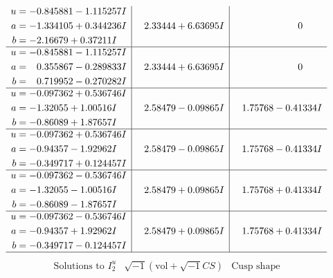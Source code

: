 \documentclass[1p]{elsarticle_modified}
\theoremstyle{definition}
\newcommand{\I}{\sqrt{-1}}
\begin{document}
$$\begin{array}{c|c|c}
\begin{aligned}
u &= -0.845881 - 1.115257 I \\
a &= -1.334105 + 0.344236 I \\
b &= -2.16679 + 0.37211 I\end{aligned}
 & \phantom{-}2.33444 + 6.63695 I & \phantom{-0.000000 } 0 \\ \hline\begin{aligned}
u &= -0.845881 - 1.115257 I \\
a &= \phantom{-}0.355867 - 0.289833 I \\
b &= \phantom{-}0.719952 - 0.270282 I\end{aligned}
 & \phantom{-}2.33444 + 6.63695 I & \phantom{-0.000000 } 0 \\ \hline\begin{aligned}
u &= -0.097362 + 0.536746 I \\
a &= -1.32055 + 1.00516 I \\
b &= -0.86089 + 1.87657 I\end{aligned}
 & \phantom{-}2.58479 - 0.09865 I & \phantom{-}1.75768 - 0.41334 I \\ \hline\begin{aligned}
u &= -0.097362 + 0.536746 I \\
a &= -0.94357 - 1.92962 I \\
b &= -0.349717 + 0.124457 I\end{aligned}
 & \phantom{-}2.58479 - 0.09865 I & \phantom{-}1.75768 - 0.41334 I \\ \hline\begin{aligned}
u &= -0.097362 - 0.536746 I \\
a &= -1.32055 - 1.00516 I \\
b &= -0.86089 - 1.87657 I\end{aligned}
 & \phantom{-}2.58479 + 0.09865 I & \phantom{-}1.75768 + 0.41334 I \\ \hline\begin{aligned}
u &= -0.097362 - 0.536746 I \\
a &= -0.94357 + 1.92962 I \\
b &= -0.349717 - 0.124457 I\end{aligned}
 & \phantom{-}2.58479 + 0.09865 I & \phantom{-}1.75768 + 0.41334 I\\
 \hline 
 \end{array}$$\newpage$$\begin{array}{c|c|c}  
\text{Solutions to }I^u_{2}& \I (\text{vol} + \sqrt{-1}CS) & \text{Cusp shape}\\
 \hline 
\begin{aligned}

\end{aligned}
\end{array}$$
\end{document}
